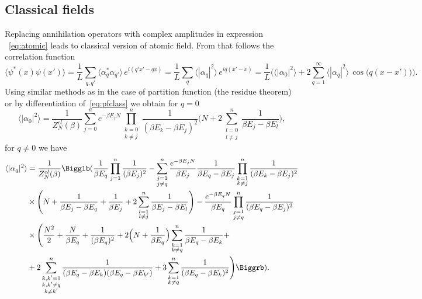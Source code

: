 \documentclass[aps,pra,reprint]{revtex4-2}
\begin{document}
\subsection*{Classical fields}
Replacing annihilation operators with complex amplitudes in expression
~\eqref{eq:atomic} leads to classical version of atomic field. From that 
follows the correlation function
\begin{equation}
\langle \psi^{*}(x) \psi(x') \rangle = \frac{1}{L} \sum_{q,q'} \langle 
\alpha_q^* \alpha_{q'} \rangle \, e^{i (q'x'-qx)} = \frac{1}{L} \sum_{q} 
\langle |\alpha_q|^2 \rangle \, e^{i q(x'-x)} = \frac{1}{L} 
\bigg(\langle |\alpha_0|^2 \rangle + 2\sum_{q=1}^{\infty} 
\langle |\alpha_q|^2 \rangle \, \cos \big(q(x-x')\big) \bigg).
\end{equation}
Using similar methods as in the case of partition function (the residue 
theorem) or by differentiation of~\eqref{eq:pfclass} we obtain for $q=0$
\begin{equation}
\langle |\alpha_0|^2 \rangle = \frac{1}{Z_N^{cl}(\beta)} 
\sum_{j=0}^n e^{-\beta E_j N} \prod_{\substack{k=0 \\ k \neq j}}^n 
\frac{1}{(\beta E_k - \beta E_j )^2} \Bigg(N + 
2\sum_{\substack{l=0 \\ l \neq j}}^n \frac{1}{\beta E_j-\beta E_l} \Bigg),
\end{equation}
for $q \neq 0$ we have
\begin{equation}
\begin{split}
\langle |\alpha _q|^2 \rangle &= \frac{1}{Z_N^{cl}(\beta)} 
\Bigglb (\frac{1}{\beta E_q} \prod_{j=1}^n \frac{1}{(\beta E_j)^2} - 
\sum_{\substack{j=1 \\ j\neq q}}^n \frac{e^{-\beta E_j N}}{\beta E_j} 
\frac{1}{\beta E_q-\beta E_j} \prod_{\substack{k=1 \\ k \neq j}}^n 
\frac{1}{(\beta E_k -\beta E_j)^2} \\ 
& \times \Bigg(N + \frac{1}{\beta E_j -\beta E_q} + \frac{1}{\beta E_j} + 
2\sum_{\substack{l=1 \\ l \neq j}}^n \frac{1}{\beta E_j -\beta E_l} \Bigg) - 
\frac{e^{-\beta E_q N}}{\beta E_q} \prod_{\substack{j=1 \\ j \neq q}}^n 
\frac{1}{(\beta E_q-\beta E_j)^2} \\ 
& \times \Bigg(\frac{N^2}{2} + \frac{N}{\beta E_q} + \frac{1}{(\beta E_q)^2} + 
2\Big(N + \frac{1}{\beta E_q} \Big) \sum_{\substack{k=1 \\ k \neq q}}^n 
\frac{1}{\beta E_q -\beta E_k} + \\ 
& + 2\sum_{\substack{k,k'=1 \\ k,k' \neq q \\ k \neq k'}}^n 
\frac{1}{(\beta E_q- \beta E_k) (\beta E_q- \beta E_{k'})} + 
3\sum_{\substack{k=1 \\ k \neq q}}^n \frac{1}{(\beta E_q-\beta E_k)^2} 
\Bigg) \Biggrb ).
\end{split}
\end{equation}
\end{document}
